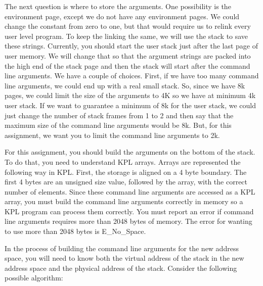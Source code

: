 \documentclass[12pt]{article}
\begin{document}
The next question is where to store the arguments.  One possibility
is the environment page, except we do not have any environment
pages.  We could change the constant from zero to one, but that
would require us to relink every user level program.   To keep
the linking the same, we will use the stack to save these strings.
Currently, you should start the user stack just after the last
page of user memory.  We will change that so that the argument
strings are packed into the high end of the stack page and then
the stack will start after the command line arguments.  We have
a couple of choices.  First, if we have too many command line
arguments, we could end up with a real small stack.  So, since
we have 8k pages, we could limit the size of the arguments to
4K so we have at minimum 4k user stack.   If we want to guarantee
a minimum of 8k for the user stack, we could just change the
number of stack frames from 1 to 2 and then say that the maximum
size of the command line arguments would be 8k.  But, for
this assignment, we want you to limit the command line arguments
to 2k.

For this assignment, you should build the arguments on the bottom of
the stack.  To do that, you need to understand KPL arrays.  Arrays are
represented the following way in KPL. First, the storage is aligned on
a 4 byte boundary.  The first 4 bytes are an unsigned size value,
followed by the array, with the correct number of elements.  Since
these command line arguments are accessed as a KPL array, you must
build the command line arguments correctly in memory so a KPL program
can process them correctly. You must report an error if command line
arguments requires more than 2048 bytes of memory.  The error for
wanting to use more than 2048 bytes is E\_No\_Space.

In the process of building the command line arguments for the new
address space, you will need to know both the virtual address of
the stack in the new address space and the physical address of
the stack.  Consider the following possible algorithm:
\end{document}
